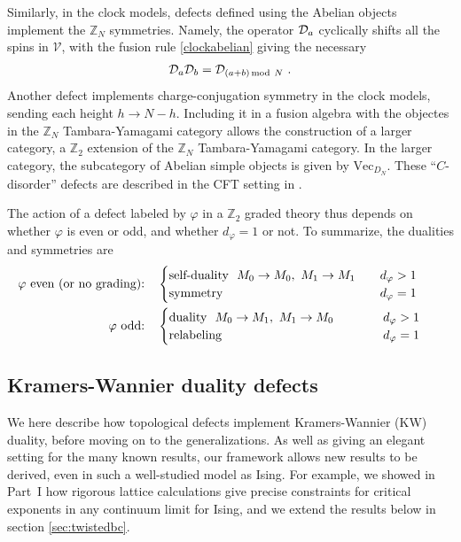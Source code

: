 Similarly, in the clock models, defects defined using the Abelian objects implement the $\mathbb{Z}_N$ symmetries. Namely, the operator $\mathcal{D}_a$ cyclically shifts all the spins in $\mathcal{V}$, with the fusion rule \eqref{clockabelian} giving the necessary
\begin{align}
\mathcal{D}_a\mathcal{D}_b = \mathcal{D}_{(a+b)\,{\rm mod}\ N}\ .
\end{align}
Another defect implements charge-conjugation symmetry in the clock models, sending each height $h\to N-h$. 
Including it in a fusion algebra with the objectes in the $\mathbb{Z}_N$ Tambara-Yamagami category allows the construction of a larger category,  a $\mathbb{Z}_2$ extension of the $\mathbb{Z}_N$ Tambara-Yamagami category. 
In the larger category, the subcategory of Abelian simple objects is given by $\text{Vec}_{D_N}$.
These ``$C$-disorder'' defects are described in the CFT setting in \cite{Zamolodchikov86}. 



The action of a defect labeled by $\varphi$ in a $\mathbb{Z}_2$ graded theory thus depends on whether $\varphi$ is even or odd, and whether $d_\varphi=1$ or not. 
To summarize, the dualities and symmetries are
\begin{align*}
\varphi\hbox{ even (or no grading):} \quad&\begin{cases} \hbox{self-duality }\ M_0\to M_0,\ M_1\to M_1\quad&d_\varphi>1\quad\\
\hbox{symmetry}&d_\varphi=1
\end{cases}\cr
\varphi\hbox{ odd:} \quad&\begin{cases} \hbox{duality }\ M_0\to M_1,\ M_1\to M_0\qquad\quad&d_\varphi>1\\
\hbox{relabeling}&d_\varphi=1
\end{cases}
\end{align*}






\subsection{Kramers-Wannier duality defects}
\label{sec:KWduality}


We here describe how topological defects implement Kramers-Wannier (KW) duality, before moving on to the generalizations. As well as giving an elegant setting for the many known results, our framework allows new results to be derived, even in such a well-studied model as Ising. For example, we showed in Part~I how rigorous lattice calculations give precise constraints for critical exponents in any continuum limit for Ising, and we extend the results below in section \ref{sec:twistedbc}.

